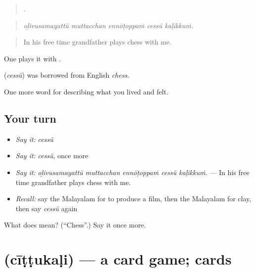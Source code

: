 \begin{quote}
    .
\end{quote}

\begin{quote}
\emph{oḻivusamayattŭ muttacchan ennōṭoppaṁ cessŭ kaḷikkuṁ.}
\end{quote}

\begin{quote}
In his free time grandfather plays chess with me.
\end{quote}

One plays it with .

\begin{cousinweb}
\textbf{} (\emph{cessŭ}) was borrowed from English \emph{chess}.
\end{cousinweb}

\begin{grammarlens}[title={What you've built}]
One more word for describing what you lived and felt.
\end{grammarlens}

\subsection*{Your turn}
\begin{itemize}
\raggedright
  \item \emph{Say it:} \emph{cessŭ}
  \item \emph{Say it:} \emph{cessŭ}, once more
  \item \emph{Say it:} \emph{oḻivusamayattŭ muttacchan ennōṭoppaṁ cessŭ kaḷikkuṁ.} — In his free time grandfather plays chess with me.
  \item \emph{Recall:} say the Malayalam for to produce a film, then the Malayalam for clay, then say \emph{cessŭ} again
\end{itemize}

\begin{tcolorbox}[breakable,colback=teal!4,colframe=teal!35!black,title={Before you move on}]
What does  mean? (\textquotedblleft{}Chess\textquotedblright{}.) Say it once more.
\end{tcolorbox}
\section[\texorpdfstring{\ml{ചീട്ടുകളി} (cīṭṭukaḷi)}{ചീട്ടുകളി (cīṭṭukaḷi)}]{ (cīṭṭukaḷi) — a card game; cards}

